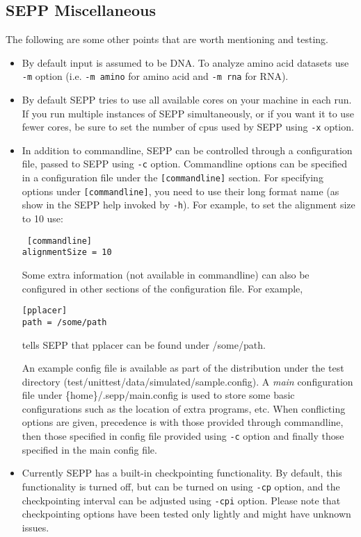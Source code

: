 \documentclass[11pt]{article} %
\newcommand{\sepp}{SEPP\xspace}
\newcommand{\ins}[1]{{\tt #1}}
\newcommand{\file}[1]{{\sf #1}}
\newcommand{\pplacer}{pplacer\xspace}
\begin{document}
\subsection{\sepp Miscellaneous }
The following are some other points that are worth mentioning and testing.
\begin{itemize}
\item By default input is assumed to be DNA. To analyze amino acid datasets use \ins{-m} option (i.e. \ins{-m amino} for amino acid and \ins{-m rna} for RNA).
\item By default \sepp tries to use all available cores on your machine in each run. If you run multiple instances of \sepp simultaneously, or if you want it to use fewer cores, be sure
to set the number of cpus used by \sepp using \ins{-x} option. 
\item In addition to commandline, \sepp can be 
controlled through a configuration file, passed to \sepp using \ins{-c} option. 
Commandline options can be specified in a configuration file under the \ins{[commandline]} section.
For specifying options under \ins{[commandline]}, you need to use their long format name (as show in the \sepp help invoked by \ins{-h}).
For example, to set the alignment size to 10 use:

\ins{
[commandline]\\
alignmentSize = 10} 
 
Some extra information (not available in commandline) can also be configured in other sections of the configuration file. For example, 

\ins{[pplacer]\\
path = /some/path
}

tells \sepp that \pplacer can be found under \file{/some/path}.

An example config file is available as part of the distribution under the test directory (\file{test/unittest/data/simulated/sample.config}). 
A {\em main} configuration file under \file{\{home\}/.sepp/main.config} is used
to store some basic configurations such as the location of extra programs, etc.
When conflicting options are given, precedence is with those provided through commandline, then those specified in config file provided using \ins{-c} option and finally those specified in the main config file. 

\item Currently \sepp has a built-in checkpointing functionality.
By default, this functionality is turned off, but can be turned on using \ins{-cp} option, 
and the checkpointing interval can be adjusted using \ins{-cpi} option.
Please note that checkpointing options have been tested only lightly and might have unknown issues. 
\end{itemize}




\end{document}
